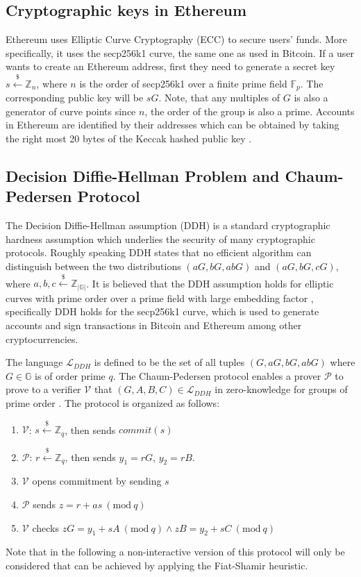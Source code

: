 \documentclass[a4paper]{article}
\theoremstyle{definition}
\newcommand{\Mod}[1]{\ (\mathrm{mod}\ #1)}
\begin{document}
\subsection{Cryptographic keys in Ethereum}
Ethereum uses Elliptic Curve Cryptography (ECC) to secure users' funds. More specifically, it uses the secp256k1 curve, the same one as used in Bitcoin. If a user wants to create an Ethereum address, first they need to generate a secret key  $s\stackrel{\$}{\leftarrow}\mathbb{Z}_n$, where $n$ is the order of secp256k1 over a finite prime field $\mathbb{F}_{p}$. The corresponding public key will be $sG$. Note, that any multiples of $G$ is also a generator of curve points since $n$, the order of the group is also a prime. Accounts in Ethereum are identified by their addresses which can be obtained by taking the right most 20 bytes of the Keccak hashed public key \cite{wood2014ethereum}. 
    
\subsection{Decision Diffie-Hellman Problem and Chaum-Pedersen Protocol}

The Decision Diffie-Hellman assumption (DDH) is a standard cryptographic hardness assumption which underlies the security of many cryptographic protocols. Roughly speaking DDH states that no efficient algorithm can distinguish between the two distributions $(aG, bG, abG)$ and $(aG, bG, cG)$, where $a,b,c\stackrel{\$}{\leftarrow}\mathbb{Z}_{|\mathbb{G}|}$. It is believed that the DDH assumption holds for elliptic curves with prime order over a prime field with large embedding factor \cite{boneh1998decision}, specifically DDH holds for the secp256k1 curve, which is used to generate accounts and sign transactions in Bitcoin and Ethereum among other cryptocurrencies. 

The language $\mathcal{L}_{DDH}$ is defined to be the set of all tuples $(G,aG,bG,abG)$ where $G\in \mathbb{G}$ is of order prime $q$. The Chaum-Pedersen protocol enables a prover $\mathcal{P}$ to prove to a verifier $\mathcal{V}$ that $(G,A,B,C)\in\mathcal{L}_{DDH}$ in zero-knowledge for groups of prime order \cite{chaum1992wallet}. The protocol is organized as follows:

\begin{enumerate}
	\item $\mathcal{V}$: $s\stackrel{\$}{\leftarrow}\mathbb{Z}_q$, then sends $commit(s)$ 
	\item $\mathcal{P}$: $r\stackrel{\$}{\leftarrow}\mathbb{Z}_q$, then sends $y_1=rG$, $y_2=rB$.
	\item $\mathcal{V}$ opens commitment by sending $s$
	\item $\mathcal{P}$ sends $z=r+as \Mod{q}$
	\item $\mathcal{V}$ checks $zG=y_{1}+sA \Mod{q} \land zB=y_{2}+sC \Mod{q}$
\end{enumerate} 
Note that in the following a non-interactive version of this protocol will only be considered that can be achieved by applying the Fiat-Shamir heuristic. 
\end{document}
